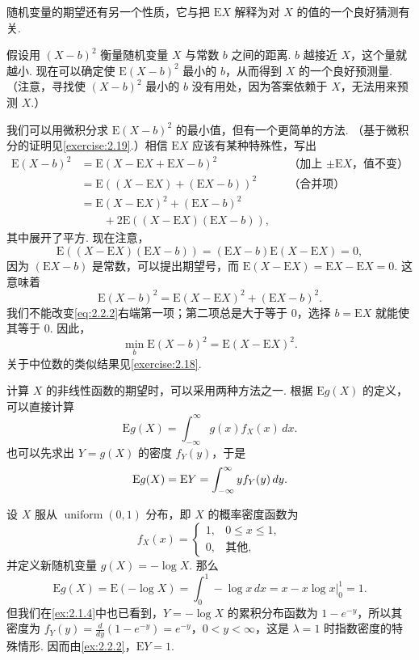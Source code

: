 \begin{example}[距离最小化]\label{ex:2.2.6}
随机变量的期望还有另一个性质，它与把 $\mathrm EX$ 解释为对 $X$ 的值的一个良好猜测有关.

假设用 $(X-b)^2$ 衡量随机变量 $X$ 与常数 $b$ 之间的距离. $b$ 越接近 $X$，这个量就越小. 现在可以确定使 $\mathrm E(X-b)^2$ 最小的 $b$，从而得到 $X$ 的一个良好预测量. （注意，寻找使 $(X-b)^2$ 最小的 $b$ 没有用处，因为答案依赖于 $X$，无法用来预测 $X$.）

我们可以用微积分求 $\mathrm E(X-b)^2$ 的最小值，但有一个更简单的方法. （基于微积分的证明见\autoref{exercise:2.19}.）相信 $\mathrm EX$ 应该有某种特殊性，写出
$$\begin{aligned}
\mathrm E(X-b)^2&=\mathrm E(X-\mathrm EX+\mathrm EX-b)^2&&\text{（加上 $\pm\mathrm EX$，值不变）}\\
&=\mathrm E((X-\mathrm EX)+(\mathrm EX-b))^2&&\text{（合并项）}\\
&=\mathrm E(X-\mathrm EX)^2+(\mathrm EX-b)^2\\
&\qquad+2\mathrm E((X-\mathrm EX)(\mathrm EX-b)),
\end{aligned}$$
其中展开了平方. 现在注意，
$$\mathrm E((X-\mathrm EX)(\mathrm EX-b))=(\mathrm EX-b)\mathrm E(X-\mathrm EX)=0,$$
因为 $(\mathrm EX-b)$ 是常数，可以提出期望号，而 $\mathrm E(X-\mathrm EX)=\mathrm EX-\mathrm EX=0$. 这意味着
\begin{equation}\label{eq:2.2.2}
\mathrm E(X-b)^2=\mathrm E(X-\mathrm EX)^2+(\mathrm EX-b)^2.
\end{equation}
我们不能改变\eqref{eq:2.2.2}右端第一项；第二项总是大于等于 $0$，选择 $b=\mathrm EX$ 就能使其等于 $0$. 因此，
\begin{equation}\label{eq:2.2.3}
\min_b\mathrm E(X-b)^2=\mathrm E(X-\mathrm EX)^2.
\end{equation}
关于中位数的类似结果见\autoref{exercise:2.18}.
\end{example}

计算 $X$ 的非线性函数的期望时，可以采用两种方法之一. 根据 $\mathrm Eg(X)$ 的定义，可以直接计算
\begin{equation}\label{eq:2.2.4}
\mathrm Eg(X)=\int_{-\infty}^\infty g(x)f_X(x)\,dx.
\end{equation}
也可以先求出 $Y=g(X)$ 的密度 $f_Y(y)$，于是
\begin{equation}\label{eq:2.2.5}\index{SI0434@两种计算方法}
\mathrm Eg(X)=\mathrm EY=\int_{-\infty}^\infty yf_Y(y)\,dy.
\end{equation}

\begin{example}[均匀分布与指数分布的关系——II]\label{ex:2.2.7}
设 $X$ 服从 $\operatorname{uniform}(0,1)$ 分布，即 $X$ 的概率密度函数为
$$f_X(x)=\begin{cases}1,&0\le x\le1,\\0,&\text{其他},\end{cases}$$
并定义新随机变量 $g(X)=-\log X$. 那么
$$\mathrm Eg(X)=\mathrm E(-\log X)=\int_0^1-\log x\,dx
=\left.x-x\log x\right|_0^1=1.$$
但我们在\autoref{ex:2.1.4}中也已看到，$Y=-\log X$ 的累积分布函数为 $1-e^{-y}$，所以其密度为 $f_Y(y)=\frac d{dy}(1-e^{-y})=e^{-y}$，$0<y<\infty$，这是 $\lambda=1$ 时指数密度的特殊情形. 因而由\autoref{ex:2.2.2}，$\mathrm EY=1$.
\end{example}
